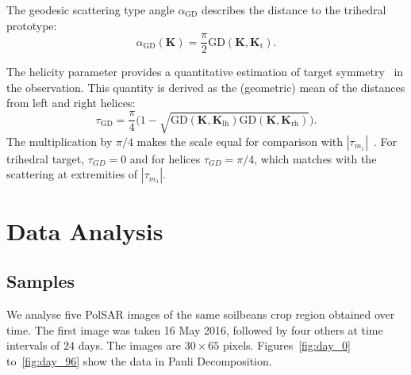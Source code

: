 \documentclass[journal]{IEEEtran}
\begin{document}

The geodesic scattering type angle $\alpha_{\text{GD}}$ describes 
the distance to the trihedral prototype:
\begin{equation}
\alpha_{\text{GD}}(\bm{K}) = \frac{\pi}{2}  \text{GD}(\bm{K},\bm{K}_{\text{t}}).
\end{equation}

The helicity parameter provides a quantitative estimation of target symmetry~\cite{Touzi:TGARS:2007} in the observation. 
This quantity is derived as the (geometric) mean of the distances from left and right helices:
\begin{equation}
\tau_{\text{GD}} = \frac\pi4 \big(1 - \sqrt{\text{GD}(\bm{K},\bm{K}_{\text{lh}})\text{GD}(\bm{K},\bm{K}_{\text{rh}})}\big).
\end{equation}
The multiplication by $\pi/4$ makes the scale equal for comparison with $|\tau_{m_1}|$~\cite{Touzi:TGARS:2007}. 
For trihedral target, $\tau_{GD} = 0$ and for helices $\tau_{GD} = \pi/4$, which matches with the scattering at extremities of $|\tau_{m_1}|$. 

\section{Data Analysis}



\subsection{Samples}

We analyse five PolSAR images of the same soilbeans crop region obtained over time. 
The first image was taken 16 May 2016, followed by four others at time intervals of $24$ days. The images are $30 \times 65$ pixels.
Figures~\ref{fig:day_0} to~\ref{fig:day_96} show the data in Pauli Decomposition. 
\end{document}
